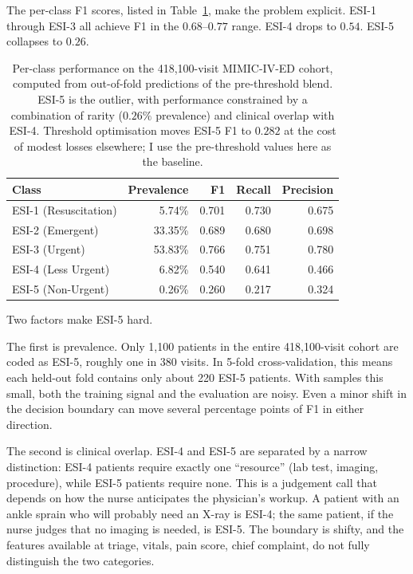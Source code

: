 The per-class F1 scores, listed in Table~\ref{tab:per-class-f1}, make the problem explicit. ESI-1 through ESI-3 all achieve F1 in the $0.68$--$0.77$ range. ESI-4 drops to $0.54$. ESI-5 collapses to $0.26$.

\begin{table}[htbp]
 \centering
 \caption[Per-class F1, precision, and recall]{Per-class performance on the 418,100-visit MIMIC-IV-ED cohort, computed from out-of-fold predictions of the pre-threshold blend. ESI-5 is the outlier, with performance constrained by a combination of rarity ($0.26\%$ prevalence) and clinical overlap with ESI-4. Threshold optimisation moves ESI-5 F1 to $0.282$ at the cost of modest losses elsewhere; I use the pre-threshold values here as the baseline.}
 \label{tab:per-class-f1}
 \small
 \begin{tabular}{lrrrr}
 \toprule
 Class & Prevalence & F1 & Recall & Precision \\
 \midrule
 ESI-1 (Resuscitation) & 5.74\% & 0.701 & 0.730 & 0.675 \\
 ESI-2 (Emergent) & 33.35\% & 0.689 & 0.680 & 0.698 \\
 ESI-3 (Urgent) & 53.83\% & 0.766 & 0.751 & 0.780 \\
 ESI-4 (Less Urgent) & 6.82\% & 0.540 & 0.641 & 0.466 \\
 ESI-5 (Non-Urgent) & 0.26\% & 0.260 & 0.217 & 0.324 \\
 \bottomrule
 \end{tabular}
\end{table}

Two factors make ESI-5 hard.

The first is prevalence. Only 1,100 patients in the entire 418,100-visit cohort are coded as ESI-5, roughly one in 380 visits. In 5-fold cross-validation, this means each held-out fold contains only about 220 ESI-5 patients. With samples this small, both the training signal and the evaluation are noisy. Even a minor shift in the decision boundary can move several percentage points of F1 in either direction.

The second is clinical overlap. ESI-4 and ESI-5 are separated by a narrow distinction: ESI-4 patients require exactly one ``resource'' (lab test, imaging, procedure), while ESI-5 patients require none. This is a judgement call that depends on how the nurse anticipates the physician's workup. A patient with an ankle sprain who will probably need an X-ray is ESI-4; the same patient, if the nurse judges that no imaging is needed, is ESI-5. The boundary is shifty, and the features available at triage, vitals, pain score, chief complaint, do not fully distinguish the two categories.

